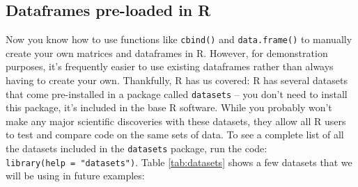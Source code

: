 \documentclass[]{book}
\newenvironment{Shaded}{\begin{snugshade}}{\end{snugshade}}
\newcommand{\KeywordTok}[1]{\textcolor[rgb]{0.13,0.29,0.53}{\textbf{{#1}}}}
\newcommand{\CommentTok}[1]{\textcolor[rgb]{0.56,0.35,0.01}{\textit{{#1}}}}
\newcommand{\NormalTok}[1]{{#1}}
\theoremstyle{definition}
\theoremstyle{definition}
\theoremstyle{remark}
\begin{document}
\begin{Shaded}
\end{Shaded}

\subsection{Dataframes pre-loaded in
R}\label{dataframes-pre-loaded-in-r}

Now you know how to use functions like \texttt{cbind()} and
\texttt{data.frame()} to manually create your own matrices and
dataframes in R. However, for demonstration purposes, it's frequently
easier to use existing dataframes rather than always having to create
your own. Thankfully, R has us covered: R has several datasets that come
pre-installed in a package called \texttt{datasets} -- you don't need to
install this package, it's included in the base R software. While you
probably won't make any major scientific discoveries with these
datasets, they allow all R users to test and compare code on the same
sets of data. To see a complete list of all the datasets included in the
\texttt{datasets} package, run the code:
\texttt{library(help\ =\ "datasets")}. Table \ref{tab:datasets} shows a
few datasets that we will be using in future examples:
\end{document}
